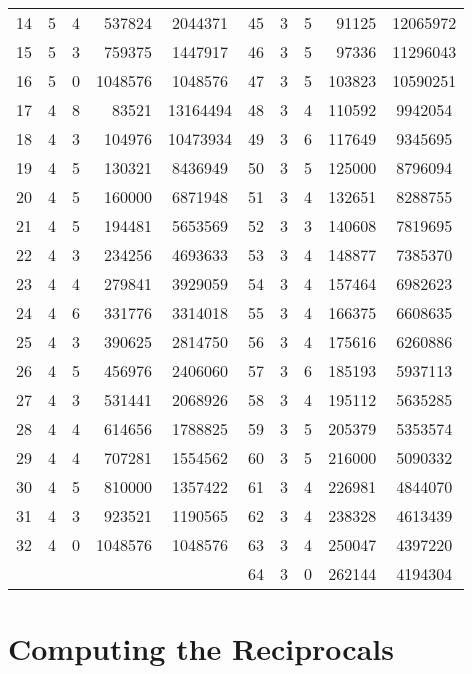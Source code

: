 \documentclass[a4paper,10pt]{article}
\theoremstyle{plain} %
\theoremstyle{definition}
\theoremstyle{remark}
\begin{document}
\begin{center}
\begin{longtable}{r r r r c | r r r r c}
14 & 5  & 4 & 537824  & 2044371  &  45 & 3  & 5 & 91125   & 12065972 \\
15 & 5  & 3 & 759375  & 1447917  &  46 & 3  & 5 & 97336   & 11296043 \\
16 & 5  & 0 & 1048576 & 1048576  &  47 & 3  & 5 & 103823  & 10590251 \\
17 & 4  & 8 & 83521   & 13164494 &  48 & 3  & 4 & 110592  & 9942054  \\
18 & 4  & 3 & 104976  & 10473934 &  49 & 3  & 6 & 117649  & 9345695  \\
19 & 4  & 5 & 130321  & 8436949  &  50 & 3  & 5 & 125000  & 8796094  \\
20 & 4  & 5 & 160000  & 6871948  &  51 & 3  & 4 & 132651  & 8288755  \\
21 & 4  & 5 & 194481  & 5653569  &  52 & 3  & 3 & 140608  & 7819695  \\
22 & 4  & 3 & 234256  & 4693633  &  53 & 3  & 4 & 148877  & 7385370  \\
23 & 4  & 4 & 279841  & 3929059  &  54 & 3  & 4 & 157464  & 6982623  \\
24 & 4  & 6 & 331776  & 3314018  &  55 & 3  & 4 & 166375  & 6608635  \\
25 & 4  & 3 & 390625  & 2814750  &  56 & 3  & 4 & 175616  & 6260886  \\
26 & 4  & 5 & 456976  & 2406060  &  57 & 3  & 6 & 185193  & 5937113  \\
27 & 4  & 3 & 531441  & 2068926  &  58 & 3  & 4 & 195112  & 5635285  \\
28 & 4  & 4 & 614656  & 1788825  &  59 & 3  & 5 & 205379  & 5353574  \\
29 & 4  & 4 & 707281  & 1554562  &  60 & 3  & 5 & 216000  & 5090332  \\
30 & 4  & 5 & 810000  & 1357422  &  61 & 3  & 4 & 226981  & 4844070  \\
31 & 4  & 3 & 923521  & 1190565  &  62 & 3  & 4 & 238328  & 4613439  \\
32 & 4  & 0 & 1048576 & 1048576  &  63 & 3  & 4 & 250047  & 4397220 \\
   &    &   &         &          &  64 & 3  & 0 & 262144  & 4194304
\end{longtable}
\label{tab:startvalues}
\end{center}

\section{Computing the Reciprocals}
\end{document}
